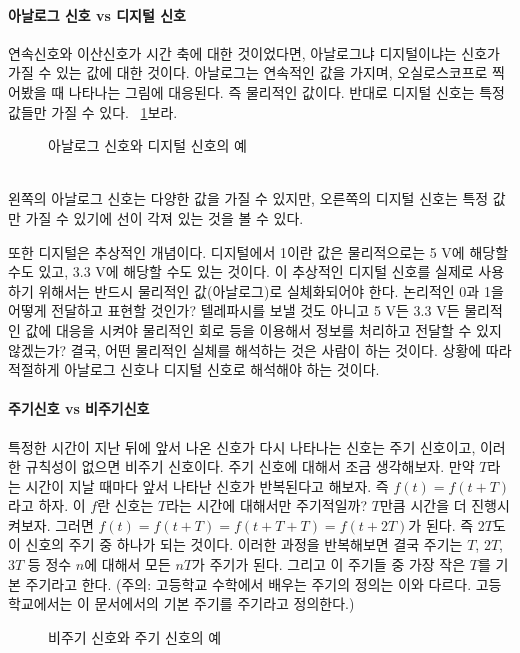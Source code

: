 \paragraph{아날로그 신호 vs 디지털 신호}
연속신호와 이산신호가 시간 축에 대한 것이었다면, 아날로그냐 디지털이냐는 신호가 가질 수 있는 값에 대한 것이다. 아날로그는 연속적인 값을 가지며, 오실로스코프로 찍어봤을 때 나타나는 그림에 대응된다. 즉 물리적인 값이다.
반대로 디지털 신호는 특정 값들만 가질 수 있다. \figurename~\ref{fig:analog vs digital}\을 보라. 
\begin{figure}[!hbp]
    \centering
    \caption{아날로그 신호와 디지털 신호의 예}\label{fig:analog vs digital}
\end{figure}
\\
왼쪽의 아날로그 신호는 다양한 값을 가질 수 있지만, 오른쪽의 디지털 신호는 특정 값만 가질 수 있기에 선이 각져 있는 것을 볼 수 있다.
\par
또한 디지털은 추상적인 개념이다. 디지털에서 1이란 값은 물리적으로는 5 V에 해당할 수도 있고, 3.3 V에 해당할 수도 있는 것이다.
이 추상적인 디지털 신호를 실제로 사용하기 위해서는 반드시 물리적인 값(아날로그)로 실체화되어야 한다.
논리적인 0과 1을 어떻게 전달하고 표현할 것인가? 텔레파시를 보낼 것도 아니고 5 V든 3.3 V든 물리적인 값에 대응을 시켜야 물리적인 회로 등을 이용해서 정보를 처리하고 전달할 수 있지 않겠는가?
결국, 어떤 물리적인 실체를 해석하는 것은 사람이 하는 것이다. 상황에 따라 적절하게 아날로그 신호나 디지털 신호로 해석해야 하는 것이다.
\paragraph{주기신호 vs 비주기신호}
특정한 시간이 지난 뒤에 앞서 나온 신호가 다시 나타나는 신호는 주기 신호이고, 이러한 규칙성이 없으면 비주기 신호이다.
주기 신호에 대해서 조금 생각해보자. 만약 $T$라는 시간이 지날 때마다 앞서 나타난 신호가 반복된다고 해보자. 즉 $f(t)=f(t+T)$라고 하자.
이 $f$란 신호는 $T$라는 시간에 대해서만 주기적일까? $T$만큼 시간을 더 진행시켜보자. 그러면 $f(t)=f(t+T)=f(t+T+T)=f(t+2T)$\label{eqn:periodic signal}가 된다. 즉 $2T$도 이 신호의 주기 중 하나가 되는 것이다.
이러한 과정을 반복해보면 결국 주기는 $T$, $2T$, $3T$ 등 정수 $n$에 대해서 모든 $nT$가 주기가 된다. 그리고 이 주기들 중 가장 작은 $T$를 기본 주기라고 한다.
(주의: 고등학교 수학에서 배우는 주기의 정의는 이와 다르다. 고등학교에서는 이 문서에서의 기본 주기를 주기라고 정의한다.)
\begin{figure}[!hbp]
    \centering
    \caption{비주기 신호와 주기 신호의 예}
\end{figure}
